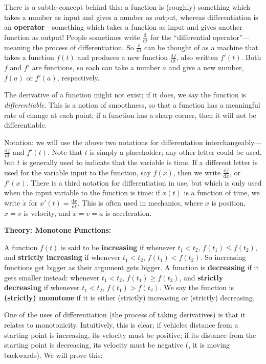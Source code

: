 \documentclass{article}
\newcommand{\deriv}[2]{\frac{\mathrm{d}#1}{\mathrm{d}#2}}
\begin{document}
There is a subtle concept behind this: a function is (roughly) something which takes a number as input and gives a number as output, whereas differentiation is an \textbf{operator}---something which takes a function as input and gives another function as output! People sometimes write $\deriv{}{t}$ for the ``differential operator''---meaning the process of differentiation. So $\deriv{}{t}$ can be thought of as a machine that takes a function $f(t)$ and produces a new function $\deriv{f}{t}$, also written $f'(t)$. Both $f$ and $f'$ are functions, so each can take a number $a$ and give a new number, $f(a)$ or $f'(a)$, respectively.

The derivative of a function might not exist; if it does, we say the function is \textit{differentiable}. This is a notion of smoothness, so that a function has a meaningful rate of change at each point; if a function has a sharp corner, then it will not be differentiable.\bigskip

Notation: we will use the above two notations for differentation interchangeably---$\deriv{f}{t}$ and $f'(t)$. Note that $t$ is simply a placeholder; any other letter could be used, but $t$ is generally used to indicate that the variable is time. If a different letter is used for the variable input to the function, say $f(x)$, then we write $\deriv{f}{x}$, or $f'(x)$. There is a third notation for differentiation in use, but which is only used when the input variable to the function is time: if $x(t)$ is a function of time, we write $\dot{x}$ for $x'(t)=\deriv{x}{t}$. This is often used in mechanics, where $x$ is position, $\dot{x}=v$ is velocity, and $\ddot{x}=\dot{v}=a$ is acceleration.

\clearpage



\textbf{Theory: Monotone Functions:}

\vspace{5mm}


A function $f(t)$ is said to be \textbf{increasing} if whenever $t_1<t_2$, $f(t_1)\leq f(t_2)$, and \textbf{strictly increasing} if whenever $t_1<t_2$, $f(t_1)<f(t_2)$. So increasing functions get bigger as their argument gets bigger. A function is \textbf{decreasing} if it gets smaller instead: whenever $t_1<t_2$, $f(t_1)\geq f(t_2)$, and \textbf{strictly decreasing} if whenever $t_1<t_2$, $f(t_1)>f(t_2)$. We say the function is \textbf{(strictly) monotone} if it is either (strictly) increasing or (strictly) decreasing.

One of the uses of differentiation (the process of taking derivatives) is that it relates to monotonicity. Intuitively, this is clear; if vehicles distance from a starting point is increasing, its velocity must be positive; if its distance from the starting point is decreasing, its velocity must be negative (, it is moving backwards). We will prove this:\bigskip
\end{document}
